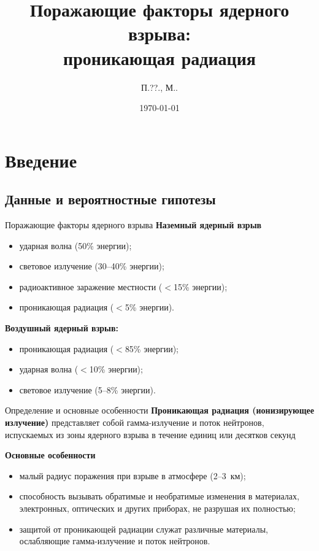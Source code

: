 \documentclass[unicode,lefteqn,c,hyperref={pdfpagelabels=false}]{beamer}
\title[\hbox to 56mm{Проникающая радиация\hfill\insertframenumber\,/\,\inserttotalframenumber}]{Поражающие факторы ядерного взрыва: \\проникающая радиация}
\author[П.\shortspace ??.\shortspaceАндрианов, М.\shortspaceО.\shortspaceБурмистров]{П.\shortspace ??.\shortspaceАндрианов, М.\shortspaceО.\shortspaceБурмистров}
\institute{\vfill Московский физико-технический институт
		\vfill Военная кафедра}
\date{\today}
\begin{document}
\begin{frame}
    \titlepage
\end{frame}
\section{Введение}
\subsection{Данные и вероятностные гипотезы}
\begin{frame}{Поражающие факторы ядерного взрыва}
    \textbf{Наземный ядерный взрыв}
    \begin{itemize}
    		\item ударная волна (50\% энергии);
    		\item световое излучение (30--40\% энергии);
    		\item радиоактивное заражение местности ($<$15\% энергии);
            \item проникающая радиация ($<$5\% энергии).
    \end{itemize}
    \bigskip
    \textbf{Воздушный ядерный взрыв:}
    \begin{itemize}
            \item проникающая радиация ($<$85\% энергии);
            \item ударная волна ($<$10\% энергии);
            \item световое излучение (5--8\% энергии).
    \end{itemize}

  
\end{frame}

\begin{frame}{Определение и основные особенности}
    \textbf{Проникающая радиация (ионизирующее излучение)}  представляет собой гамма-излучение и поток нейтронов, испускаемых из зоны ядерного взрыва в течение единиц или десятков секунд

    \smallskip

    \textbf{Основные особенности}
    \begin{itemize}
            \item малый радиус поражения при взрыве в атмосфере (2--3~км);
            \item способность вызывать обратимые и необратимые изменения в материалах, электронных, оптических и других приборах, не разрушая их полностью;
            \item защитой от проникающей радиации служат различные материалы, ослабляющие гамма-излучение и поток нейтронов.
    \end{itemize}
\end{frame}
\end{document}
